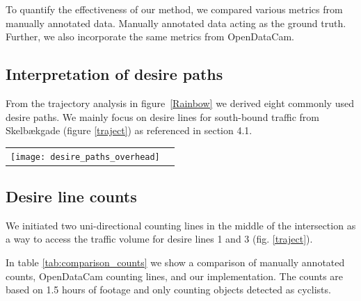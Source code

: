 To quantify the effectiveness of our method, we compared various metrics from manually annotated data. Manually annotated data acting as the ground truth. 
Further, we also incorporate the same metrics from OpenDataCam.

\subsection{Interpretation of desire paths}
From the trajectory analysis in figure~\ref{Rainbow} we derived eight commonly used desire paths.
We mainly focus on desire lines for south-bound traffic from Skelbækgade (figure \ref{traject}) as referenced in section 4.1.
\ \\

\raggedbottom
\begin{tabular}{@{}cc}
\texttt{[image: desire\_paths\_overhead]} 
\end{tabular}
\label{traject}

\subsection{Desire line counts}
We initiated two uni-directional counting lines in the middle of the intersection as a way to access the traffic volume for desire lines 1 and 3 (fig. \ref{traject}).

In table \ref{tab:comparison_counts} we show a comparison of manually annotated counts, OpenDataCam counting lines, 
and our implementation. The counts are based on 1.5 hours of footage and only counting objects detected as cyclists.

\begin{table}[h]
\caption{Comparison of counts}
\label{tab:comparison_counts}
\end{table}

